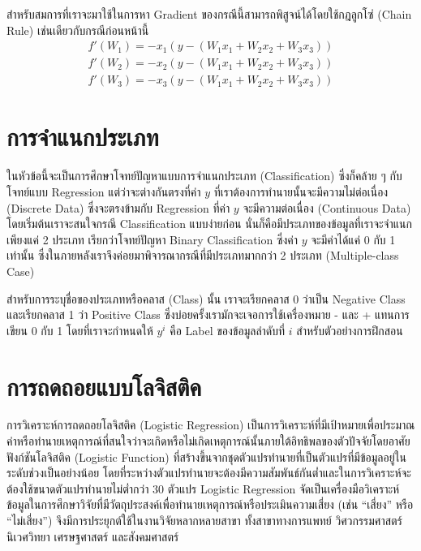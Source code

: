 สำหรับสมการที่เราจะมาใช้ในการหา Gradient ของกรณีนี้สามารถพิสูจน์ได้โดยใช้กฎลูกโซ่ (Chain Rule) เช่นเดียวกับกรณีก่อนหน้านี้
%
\begin{align}
    f'(W_1) = -x_1(y - (W_1 x_1 + W_2 x_2 + W_3 x_3)) \\
    f'(W_2) = -x_2(y - (W_1 x_1 + W_2 x_2 + W_3 x_3)) \\
    f'(W_3) = -x_3(y - (W_1 x_1 + W_2 x_2 + W_3 x_3))
\end{align}

\section{การจำแนกประเภท}
\label{sec:classification}

ในหัวข้อนี้จะเป็นการศึกษาโจทย์ปัญหาแบบการจำแนกประเภท (Classification) ซึ่งก็คล้าย ๆ กับโจทย์แบบ Regression แต่ว่าจะต่างกันตรงที่ค่า $y$ ที่เราต้องการทำนายนั้นจะมีความไม่ต่อเนื่อง (Discrete Data) ซึ่งจะตรงข้ามกับ Regression ที่ค่า $y$ จะมีความต่อเนื่อง (Continuous Data) โดยเริ่มต้นเราจะสนใจกรณี Classification แบบง่ายก่อน นั่นก็คือมีประเภทของข้อมูลที่เราจะจำแนกเพียงแค่ 2 ประเภท เรียกว่าโจทย์ปัญหา Binary Classification ซึ่งค่า $y$ จะมีค่าได้แค่ 0 กับ 1 เท่านั้น ซึ่งในภายหลังเราจึงค่อยมาพิจารณากรณีที่มีประเภทมากกว่า 2 ประเภท (Multiple-class Case)

สำหรับการระบุชื่อของประเภทหรือคลาส (Class) นั้น เราจะเรียกคลาส 0 ว่าเป็น Negative Class และเรียกคลาส 1 ว่า Positive Class ซึ่งบ่อยครั้งเรามักจะเจอการใช้เครื่องหมาย - และ + แทนการเขียน 0 กับ 1 โดยที่เราจะกำหนดให้ $y^{i}$ คือ Label ของข้อมูลลำดับที่ $i$ สำหรับตัวอย่างการฝึกสอน

\section{การถดถอยแบบโลจิสติค}
\label{sec:logis_regress}

การวิเคราะห์การถดถอยโลจิสติค (Logistic Regression) เป็นการวิเคราะห์ที่มีเป้าหมายเพื่อประมาณค่าหรือทํานายเหตุการณ์ที่สนใจว่าจะเกิดหรือไม่เกิดเหตุการณ์นั้นภายใต้อิทธิพลของตัวปัจจัยโดยอาศัยฟังก์ชันโลจิสติค (Logistic Function) ที่สร้างขึ้นจากชุดตัวแปรทำนายที่เป็นตัวแปรที่มีข้อมูลอยู่ในระดับช่วงเป็นอย่างน้อย โดยที่ระหว่างตัวแปรทำนายจะต้องมีความสัมพันธ์กันต่ำและในการวิเคราะห์จะต้องใช้ขนาดตัวแปรทำนายไม่ต่ำกว่า 30 ตัวแปร Logistic Regression จัดเป็นเครื่องมือวิเคราะห์ข้อมูลในการศึกษาวิจัยที่มีวัตถุประสงค์เพื่อทํานายเหตุการณ์หรือประเมินความเสี่ยง (เช่น \enquote{เสี่ยง} หรือ \enquote{ไม่เสี่ยง}) จึงมีการประยุกต์ใช้ในงานวิจัยหลากหลายสาขา ทั้งสาขาทางการแพทย์ วิศวกรรมศาสตร์ นิเวศวิทยา เศรษฐศาสตร์ และสังคมศาสตร์


